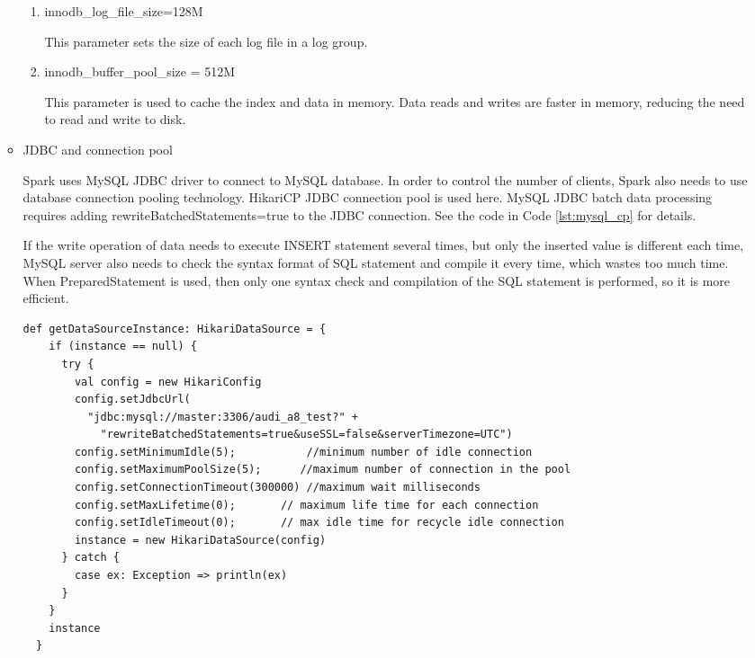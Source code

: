 \begin{enumerate}
\begin{itemize}
\begin{enumerate}
\item innodb\_log\_file\_size=128M

This parameter sets the size of each log file in a log group\cite{mariadb_log_file_size}.

\item innodb\_buffer\_pool\_size = 512M

This parameter is used to cache the index and data in memory. Data reads and writes are faster in memory, reducing the need to read and write to disk.

\end{enumerate}

\item JDBC and connection pool

Spark uses MySQL JDBC driver to connect to MySQL database. In order to control the number of clients, Spark also needs to use database connection pooling technology. HikariCP JDBC connection pool is used here. MySQL JDBC batch data processing requires adding rewriteBatchedStatements=true to the JDBC connection. See the code in Code \ref{lst:mysql_cp} for details.

If the write operation of data needs to execute INSERT statement several times, but only the inserted value is different each time, MySQL server also needs to check the syntax format of SQL statement and compile it every time, which wastes too much time. When PreparedStatement is used, then only one syntax check and compilation of the SQL statement is performed, so it is more efficient.

\renewcommand{\lstlistingname}{Code} %
\begin{lstlisting}[caption=Create MySQL database connection pool instance, style=myScalastyle, label=lst:mysql_cp]
  def getDataSourceInstance: HikariDataSource = {
    if (instance == null) {
      try {
        val config = new HikariConfig
        config.setJdbcUrl(
          "jdbc:mysql://master:3306/audi_a8_test?" +
            "rewriteBatchedStatements=true&useSSL=false&serverTimezone=UTC")
        config.setMinimumIdle(5);           //minimum number of idle connection
        config.setMaximumPoolSize(5);      //maximum number of connection in the pool
        config.setConnectionTimeout(300000) //maximum wait milliseconds
        config.setMaxLifetime(0);       // maximum life time for each connection
        config.setIdleTimeout(0);       // max idle time for recycle idle connection
        instance = new HikariDataSource(config)
      } catch {
        case ex: Exception => println(ex)
      }
    }
    instance
  }
\end{lstlisting}


\end{itemize}
\end{enumerate}
